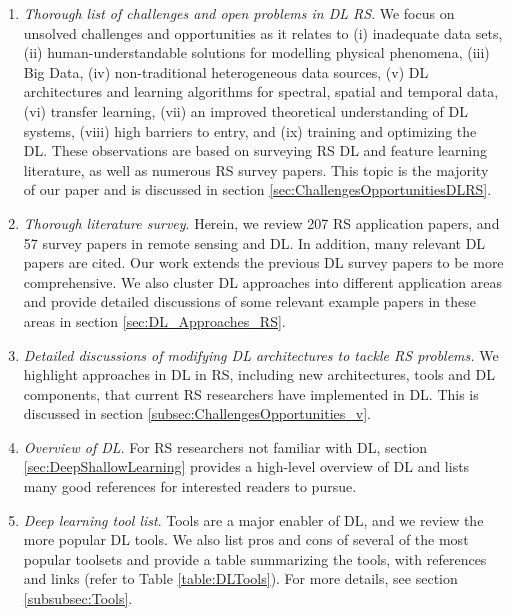 \documentclass[12pt]{spieman}
\begin{document}
\begin{spacing}{1}
\begin{enumerate}

\item \textit{Thorough list of challenges and open problems in DL RS}. We focus on unsolved challenges and opportunities as it relates to (i) inadequate data sets, (ii) human-understandable solutions for modelling physical phenomena, (iii) Big Data, (iv) non-traditional heterogeneous data sources, (v) DL architectures and learning algorithms for spectral, spatial and temporal data, (vi) transfer learning, (vii) an improved theoretical understanding of DL systems, (viii) high barriers to entry, and (ix) training and optimizing the DL. These observations are based on surveying RS DL and feature learning literature, as well as numerous RS survey papers. This topic is the majority of our paper and is discussed in section \ref{sec:ChallengesOpportunitiesDLRS}.

\item \textit{Thorough literature survey}. Herein, we review 207 RS application papers, and 57 survey papers in remote sensing and DL. In addition, many relevant DL papers are cited. Our work extends the previous DL survey papers \cite{Cheng, Deng2014, Zhang2016} to be more comprehensive. We also cluster DL approaches into different application areas and provide detailed discussions of some relevant example papers in these areas in section \ref{sec:DL_Approaches_RS}.

\item \textit{Detailed discussions of modifying DL architectures to tackle RS problems.} We highlight approaches in DL in RS, including new architectures, tools and DL components, that current RS researchers have implemented in DL. This is discussed in section \ref{subsec:ChallengesOpportunities_v}.

\item \textit{Overview of DL}. For RS researchers not familiar with DL, section \ref{sec:DeepShallowLearning} provides a high-level overview of DL and lists many good references for interested readers to pursue.

\item \textit{Deep learning tool list}. Tools are a major enabler of DL, and we review the more popular DL tools. We also list pros and cons of several of the most popular toolsets and provide a table summarizing the tools, with references and links (refer to Table \ref{table:DLTools}). For more details, see section \ref{subsubsec:Tools}.


\end{enumerate}
\end{spacing}
\end{document}

